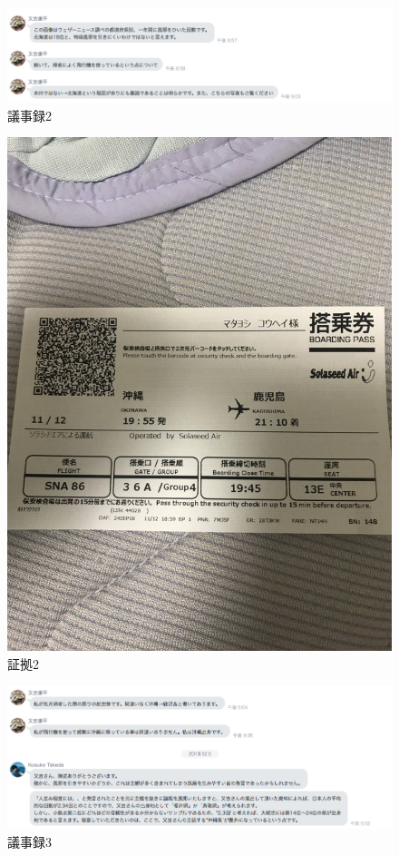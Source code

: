 \begin{figure}[H]
  \centering
  \includegraphics[clip,scale=0.5]{./section/Taira/figures/giji2.png}
  \caption{議事録2}
\label{giji2}
\end{figure}

\begin{figure}[H]
  \centering
  \includegraphics[clip,scale=0.2]{./section/Taira/figures/fig2}
  \caption{証拠2}
\label{fig2}
\end{figure}

\begin{figure}[H]
  \centering
  \includegraphics[clip,scale=0.5]{./section/Taira/figures/giji3.png}
  \caption{議事録3}
\label{giji3}
\end{figure}

